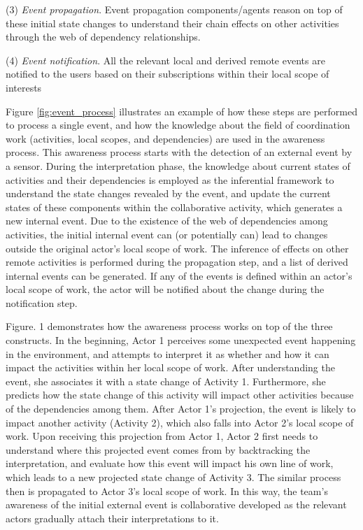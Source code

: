 (3) \emph{Event propagation}. Event propagation components/agents reason on top of these initial state changes to understand their chain effects on other activities through the web of dependency relationships. 

(4) \emph{Event notification}. All the relevant local and derived remote events are notified to the users based on their subscriptions within their local scope of interests 

Figure \ref{fig:event_process} illustrates an example of how these steps are performed to process a single event, and how the knowledge about the field of coordination work (activities, local scopes, and dependencies) are used in the awareness process. This awareness process starts with the detection of an external event by a sensor. During the interpretation phase, the knowledge about current states of activities and their dependencies is employed as the inferential framework to understand the state changes revealed by the event, and update the current states of these components within the collaborative activity, which generates a new internal event. Due to the existence of the web of dependencies among activities, the initial internal event can (or potentially can) lead to changes outside the original actor’s local scope of work. The inference of effects on other remote activities is performed during the propagation step, and a list of derived internal events can be generated. If any of the events is defined within an actor's local scope of work, the actor will be notified about the change during the notification step.

Figure. 1 demonstrates how the awareness process works on top of the three constructs. In the beginning, Actor 1 perceives some unexpected event happening in the environment, and attempts to interpret it as whether and how it can impact the activities within her local scope of work. After understanding the event, she associates it with a state change of Activity 1. Furthermore, she predicts how the state change of this activity will impact other activities because of the dependencies among them. After Actor 1’s projection, the event is likely to impact another activity (Activity 2), which also falls into Actor 2’s local scope of work. Upon receiving this projection from Actor 1, Actor 2 first needs to understand where this projected event comes from by backtracking the interpretation, and evaluate how this event will impact his own line of work, which leads to a new projected state change of Activity 3. The similar process then is propagated to Actor 3’s local scope of work. In this way, the team’s awareness of the initial external event is collaborative developed as the relevant actors gradually attach their interpretations to it.

